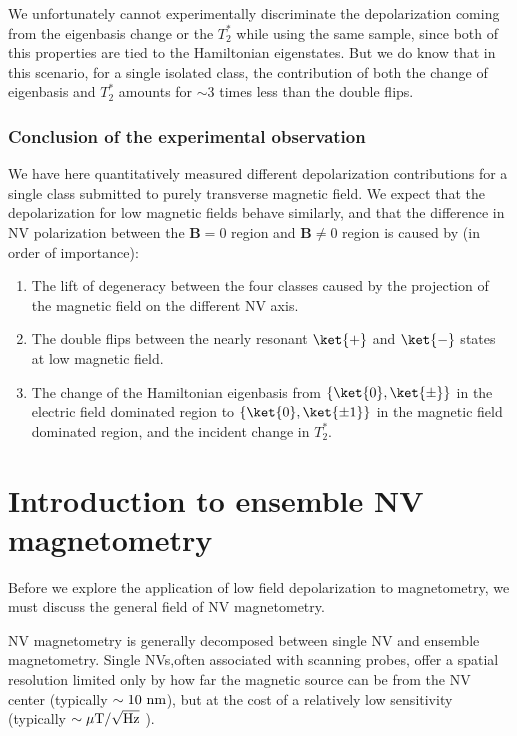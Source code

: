 \documentclass[a4paper,11pt]{report}
\begin{document}
We unfortunately cannot experimentally discriminate the depolarization coming from the eigenbasis change or the $T_2^*$ while using the same sample, since both of this properties are tied to the Hamiltonian eigenstates. But we do know that in this scenario, for a single isolated class, the contribution of both the change of eigenbasis and $T_2^*$ amounts for $\sim 3$ times less than the double flips. 

\subsubsection{Conclusion of the experimental observation}

We have here quantitatively measured different depolarization contributions for a single class submitted to purely transverse magnetic field. We expect that the depolarization for low magnetic fields behave similarly, and that the difference in NV polarization between the $\mathbf{B}=0$ region and $\mathbf{B} \neq 0$ region is caused by (in order of importance):
\begin{enumerate}
\item The lift of degeneracy between the four classes caused by the projection of the magnetic field on the different NV axis.
\item The double flips between the nearly resonant $\ket{+}$ and $\ket{-}$ states at low magnetic field.
\item The change of the Hamiltonian eigenbasis from $\{\ket{0}, \ket{\pm} \}$ in the electric field dominated region to $\{\ket{0}, \ket{\pm 1} \}$ in the magnetic field dominated region, and the incident change in $T_2^*$.
\end{enumerate}

\section{Introduction to ensemble NV magnetometry}
Before we explore the application of low field depolarization to magnetometry, we must discuss the general field of NV magnetometry. 

NV magnetometry is generally decomposed between single NV and ensemble magnetometry. Single NVs,often associated with scanning probes, offer a spatial resolution limited only by how far the magnetic source can be from the NV center (typically $\sim 10\ \rm nm$), but at the cost of a relatively low sensitivity (typically $\sim \mu \rm{T} / \sqrt{\rm Hz}$ \citep{pelliccione2016scanned}).
\end{document}
